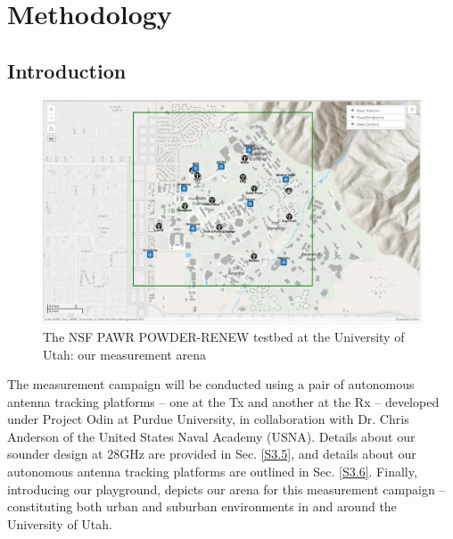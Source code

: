 \documentclass[12pt]{article}
\newcommand{\areaofinterestfigwidth}{1.0\textwidth}
\begin{document}
\section{Methodology}
    \subsection{Introduction}
        \begin{figure}
            \centering
            \includegraphics[width=\areaofinterestfigwidth]{figs/POWDER_Map.png}
            \caption{The NSF PAWR POWDER-RENEW testbed at the University of Utah: our measurement arena}
            \label{fig:map}
        \end{figure}
        The measurement campaign will be conducted using a pair of autonomous antenna tracking platforms -- one at the Tx and another at the Rx -- developed under Project Odin at Purdue University, in collaboration with Dr. Chris Anderson of the United States Naval Academy (USNA). Details about our sounder design at $28$GHz are provided in Sec. \ref{S3.5}, and details about our autonomous antenna tracking platforms are outlined in Sec. \ref{S3.6}. Finally, introducing our playground,  depicts our arena for this measurement campaign -- constituting both urban and suburban environments in and around the University of Utah.
        \clearpage
        
\end{document}
